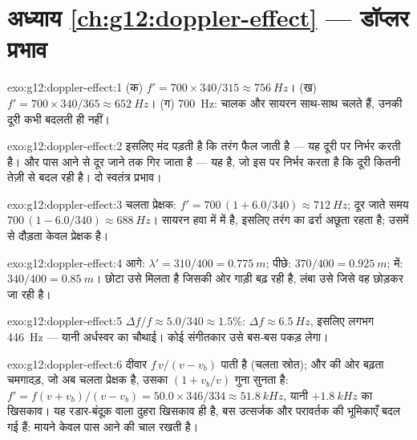 \section*{अध्याय \ref{ch:g12:doppler-effect} --- डॉप्लर प्रभाव}

\begin{solution}{exo:g12:doppler-effect:1}
(क) $f' = 700 \times 340/315 \approx \qty{756}{Hz}$।
(ख) $f' = 700 \times 340/365 \approx \qty{652}{Hz}$।
(ग) \qty{700}{Hz}: चालक और सायरन साथ-साथ चलते हैं, उनकी दूरी कभी बदलती ही नहीं।
\end{solution}

\begin{solution}{exo:g12:doppler-effect:2}
\emph{} इसलिए मंद पड़ती है कि तरंग फैल जाती है --- यह
दूरी पर निर्भर करती है। और \emph{} पास आने से दूर जाने तक गिर
जाता है --- यह  है, जो इस पर निर्भर करता है कि दूरी कितनी
तेज़ी से बदल रही है। दो स्वतंत्र प्रभाव।
\end{solution}

\begin{solution}{exo:g12:doppler-effect:3}
चलता प्रेक्षक: $f' = 700\,(1 + 6.0/340) \approx \qty{712}{Hz}$; दूर जाते समय $700\,(1 - 6.0/340) \approx \qty{688}{Hz}$। सायरन हवा में  में है, इसलिए
तरंग का ढर्रा अछूता रहता है; उसमें से दौड़ता केवल प्रेक्षक है।
\end{solution}

\begin{solution}{exo:g12:doppler-effect:4}
आगे: $\lambda' = 310/400 = \qty{0.775}{m}$; पीछे: $370/400 = \qty{0.925}{m}$;  में: $340/400 = \qty{0.85}{m}$। छोटा  उसे
मिलता है जिसकी ओर गाड़ी बढ़ रही है, लंबा उसे जिसे वह छोड़कर जा रही है।
\end{solution}

\begin{solution}{exo:g12:doppler-effect:5}
$\Delta f/f \approx 5.0/340 \approx 1.5\%$: $\Delta f \approx \qty{6.5}{Hz}$, इसलिए लगभग \qty{446}{Hz} --- यानी अर्धस्वर का चौथाई। कोई संगीतकार उसे
बस-बस पकड़ लेगा।
\end{solution}

\begin{solution}{exo:g12:doppler-effect:6}
दीवार $f\,v/(v - v_b)$ पाती है (चलता स्रोत); और  की ओर बढ़ता चमगादड़,
जो अब चलता प्रेक्षक है, उसका $(1 + v_b/v)$ गुना सुनता है: $f' = f(v + v_b)/(v - v_b) = 50.0 \times
346/334 \approx \qty{51.8}{kHz}$, यानी $+\qty{1.8}{kHz}$ का
खिसकाव। यह रडार-बंदूक़ वाला दुहरा खिसकाव ही है, बस उत्सर्जक और परावर्तक की
भूमिकाएँ बदल गई हैं: मायने केवल पास आने की चाल रखती है।
\end{solution}

